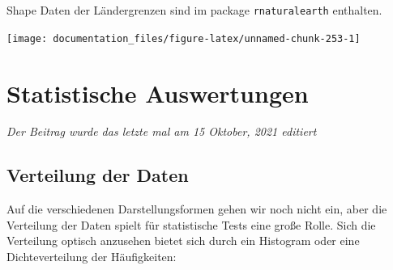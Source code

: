 \documentclass[
]{article}
\newenvironment{Shaded}{\begin{snugshade}}{\end{snugshade}}
\newcommand{\AttributeTok}[1]{\textcolor[rgb]{0.77,0.63,0.00}{#1}}
\newcommand{\CommentTok}[1]{\textcolor[rgb]{0.56,0.35,0.01}{\textit{#1}}}
\newcommand{\FunctionTok}[1]{\textcolor[rgb]{0.00,0.00,0.00}{#1}}
\newcommand{\NormalTok}[1]{#1}
\newcommand{\OtherTok}[1]{\textcolor[rgb]{0.56,0.35,0.01}{#1}}
\newcommand{\SpecialCharTok}[1]{\textcolor[rgb]{0.00,0.00,0.00}{#1}}
\newcommand{\StringTok}[1]{\textcolor[rgb]{0.31,0.60,0.02}{#1}}
\begin{document}
Shape Daten der Ländergrenzen sind im package \texttt{rnaturalearth} enthalten.

\begin{Shaded}
\end{Shaded}

\begin{center}\texttt{[image: documentation\_files/figure-latex/unnamed-chunk-253-1]} \end{center}

\hypertarget{statistische-auswertungen}{%
\section{Statistische Auswertungen}\label{statistische-auswertungen}}

\emph{Der Beitrag wurde das letzte mal am 15 Oktober, 2021 editiert}

\hypertarget{verteilung-der-daten}{%
\subsection{Verteilung der Daten}\label{verteilung-der-daten}}

Auf die verschiedenen Darstellungsformen gehen wir noch nicht ein, aber die Verteilung der Daten spielt für statistische Tests eine große Rolle. Sich die Verteilung optisch anzusehen bietet sich durch ein Histogram oder eine Dichteverteilung der Häufigkeiten:
\end{document}
